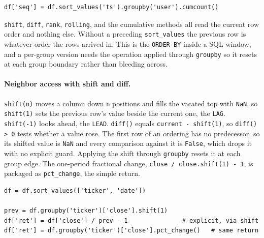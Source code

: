 \begin{lstlisting}[style=python, caption={A 0-based sequence number within each group}]
df['seq'] = df.sort_values('ts').groupby('user').cumcount()
\end{lstlisting}

\vspace{-1ex}

\begin{keybox}
\texttt{shift}, \texttt{diff}, \texttt{rank}, \texttt{rolling}, and the cumulative methods all read the current row order and nothing else. Without a preceding \texttt{sort\_values} the previous row is whatever order the rows arrived in. This is the \texttt{ORDER BY} inside a SQL window, and a per-group version needs the operation applied through \texttt{groupby} so it resets at each group boundary rather than bleeding across.
\end{keybox}

\vspace{-1ex}

\paragraph{Neighbor access with shift and diff.} \texttt{shift(n)} moves a column down \texttt{n} positions and fills the vacated top with \texttt{NaN}, so \texttt{shift(1)} sets the previous row's value beside the current one, the \texttt{LAG}. \texttt{shift(-1)} looks ahead, the \texttt{LEAD}. \texttt{diff()} equals \texttt{current - shift(1)}, so \texttt{diff() > 0} tests whether a value rose. The first row of an ordering has no predecessor, so its shifted value is \texttt{NaN} and every comparison against it is \texttt{False}, which drops it with no explicit guard. Applying the shift through \texttt{groupby} resets it at each group edge. The one-period fractional change, \texttt{close / close.shift(1) - 1}, is packaged as \texttt{pct\_change}, the simple return.

\begin{lstlisting}[style=python, caption={Per-group return against the previous row}]
df = df.sort_values(['ticker', 'date'])

prev = df.groupby('ticker')['close'].shift(1)
df['ret'] = df['close'] / prev - 1               # explicit, via shift
df['ret'] = df.groupby('ticker')['close'].pct_change()   # same return
\end{lstlisting}

\vspace{-2.5ex}

